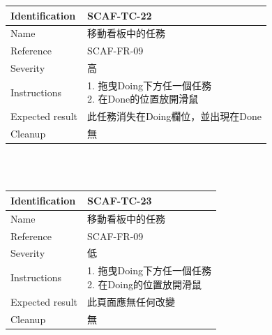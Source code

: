 \documentclass{report}
\begin{document}
\begin{tabularx}{\textwidth}{
  |p{}%
  |p{}|%
  }
  \hline
  \centering Identification &  SCAF-TC-22 \\
  \hline
  \centering Name & 移動看板中的任務 \\
  \hline
  \centering Reference & SCAF-FR-09 \\
  \hline
  \centering Severity & 高 \\
  \hline
  \centering Instructions & 
  \makecell[l]{
    1. 拖曳Doing下方任一個任務  \\
    2. 在Done的位置放開滑鼠 
  }\\
  \hline
  \centering Expected result & 此任務消失在Doing欄位，並出現在Done \\
  \hline
  \centering Cleanup & 無 \\
  \hline
\end{tabularx}
\\
\newline
\\
\begin{tabularx}{\textwidth}{
  |p{}%
  |p{}|%
  }
  \hline
  \centering Identification &  SCAF-TC-23 \\
  \hline
  \centering Name & 移動看板中的任務 \\
  \hline
  \centering Reference & SCAF-FR-09 \\
  \hline
  \centering Severity & 低 \\
  \hline
  \centering Instructions & 
  \makecell[l]{
    1. 拖曳Doing下方任一個任務  \\
    2. 在Doing的位置放開滑鼠  \\
  }\\
  \hline
  \centering Expected result & 此頁面應無任何改變 \\
  \hline
  \centering Cleanup & 無 \\
  \hline
\end{tabularx}
\\
\newline
\\
\end{document}
